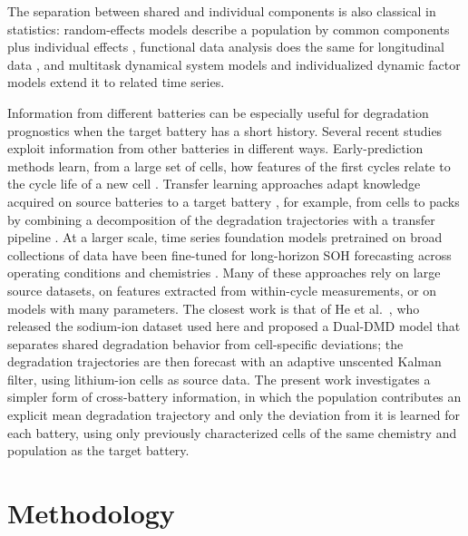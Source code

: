 \documentclass[conference]{IEEEtran}
\begin{document}
The separation between shared and individual components is also classical in statistics: random-effects models describe a population by common components plus individual effects \cite{laird1982random}, functional data analysis does the same for longitudinal data \cite{yao2005functional}, and multitask dynamical system models \cite{bird2022multitask} and individualized dynamic factor models \cite{zhang2024individualized} extend it to related time series.

Information from different batteries can be especially useful for degradation prognostics when the target battery has a short history. Several recent studies exploit information from other batteries in different ways. Early-prediction methods learn, from a large set of cells, how features of the first cycles relate to the cycle life of a new cell \cite{severson2019data}. Transfer learning approaches adapt knowledge acquired on source batteries to a target battery \cite{wang2026transfer}, for example, from cells to packs by combining a decomposition of the degradation trajectories with a transfer pipeline \cite{Lyu2025TransferPack}. At a larger scale, time series foundation models pretrained on broad collections of data have been fine-tuned for long-horizon SOH forecasting across operating conditions and chemistries \cite{fan2025batterytsfm}. Many of these approaches rely on large source datasets, on features extracted from within-cycle measurements, or on models with many parameters. The closest work is that of He et al.~\cite{He2026TransferSodium}, who released the sodium-ion dataset used here and proposed a Dual-DMD model that separates shared degradation behavior from cell-specific deviations; the degradation trajectories are then forecast with an adaptive unscented Kalman filter, using lithium-ion cells as source data. The present work investigates a simpler form of cross-battery information, in which the population contributes an explicit mean degradation trajectory and only the deviation from it is learned for each battery, using only previously characterized cells of the same chemistry and population as the target battery.


\section{Methodology}
\label{sec:metodologia}
\end{document}
